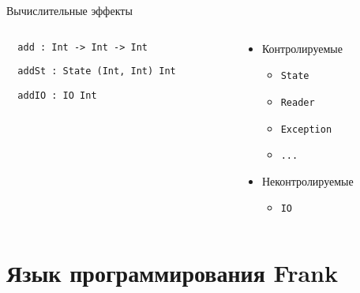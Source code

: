 \begin{frame}[fragile]{Вычислительные эффекты}
\begin{columns}
\begin{column}{0.55\textwidth}
  \begin{block}{}
  \begin{verbatim}
  add : Int -> Int -> Int
  \end{verbatim}
  \end{block}
  \begin{block}{}
  \begin{verbatim}
  addSt : State (Int, Int) Int
  \end{verbatim}
  \end{block}
  \begin{block}{}
  \begin{verbatim}
  addIO : IO Int
  \end{verbatim}
  \end{block}
\end{column}
\begin{column}{0.4\textwidth}
  \begin{itemize}
    \item Контролируемые
    \begin{itemize}
      \item \texttt{State}
      \item \texttt{Reader}
      \item \texttt{Exception}
      \item \texttt{...}
    \end{itemize}
    \item Неконтролируемые
    \begin{itemize}
      \item \texttt{IO}
    \end{itemize}
  \end{itemize}
\end{column}
\end{columns}
\end{frame}


\section{Язык программирования Frank}

